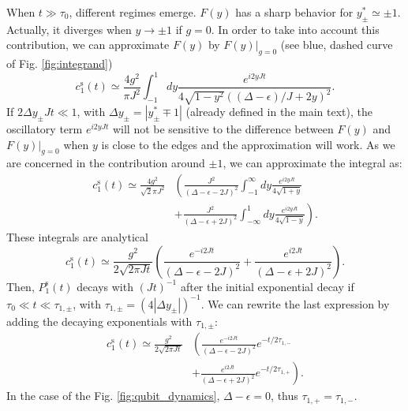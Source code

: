 \documentclass[aps,pra,twocolumn,floatfix,superscriptaddress]{revtex4-1}%
\begin{document}
When $t\gg \tau_0$, different regimes emerge. $F(y)$ has a sharp behavior for $y_\pm^*\simeq \pm 1$. Actually, it diverges when $y\to\pm 1$ if $g=0$. In order to take into account this contribution, we can approximate $F(y)$ by $F(y)|_{g=0}$ (see blue, dashed curve of Fig. \ref{fig:integrand})
\begin{equation}
c_1^\text{s}(t)\simeq \frac{4g^2}{\pi J^2}\int_{-1}^1 dy \frac{e^{i2yJt}}{4\sqrt{1-y^2}((\Delta-\epsilon)/J+2y)^2}.
\end{equation}
If $2\Delta y_\pm Jt\ll 1$, with $\Delta y_\pm=|y_\pm^*\mp 1|$ (already defined in the main text), the oscillatory term $e^{i2yJt}$ will not be sensitive to the difference between $F(y)$ and $F(y)|_{g=0}$ when $y$ is close to the edges and the approximation will work. As we are concerned in the contribution around $\pm 1$, we can approximate the integral as:
\begin{align}
c_1^\text{s}(t)  \simeq \frac{4g^2}{\sqrt{2}\pi J^2}&\left(\frac{J^2}{(\Delta-\epsilon-2J)^2}\int_{-1}^\infty dy \frac{e^{i2yJt}}{4\sqrt{1+y}}\right. \\
& \left.+ \frac{J^2}{(\Delta-\epsilon+2J)^2}\int_{-\infty}^1 dy \frac{e^{i2yJt}}{4\sqrt{1-y}}\right).\nonumber
\end{align}
These integrals are analytical
\begin{equation}
c_1^\text{s}(t)\simeq \frac{g^2}{2\sqrt{2\pi Jt}}\left(\frac{e^{-i2Jt}}{(\Delta-\epsilon-2J)^2}+\frac{e^{i2Jt}}{(\Delta-\epsilon+2J)^2}\right).\label{eq:csc_1}
\end{equation}
Then, $P_1^\text{s}(t)$ decays with $(Jt)^{-1}$ after the initial exponential decay if $\tau_0\ll t\ll \tau_{1,\pm}$, with $\tau_{1,\pm} = (4|\Delta y_\pm|)^{-1}$. We can rewrite the last expression by adding the decaying exponentials with $\tau_{1,\pm}$:
\begin{align}
c_1^\text{s}(t)\simeq \frac{g^2}{2\sqrt{2\pi Jt}}&\left(\frac{e^{-i2Jt}}{(\Delta-\epsilon-2J)^2} e^{-t/2\tau_{1,-}}\right. \nonumber \\
&\left. +\frac{e^{i2Jt}}{(\Delta-\epsilon+2J)^2} e^{-t/2\tau_{1,+}} \right).
\end{align}
In the case of the Fig. \ref{fig:qubit_dynamics}, $\Delta-\epsilon=0$, thus $\tau_{1,+}=\tau_{1,-}$.
\end{document}

